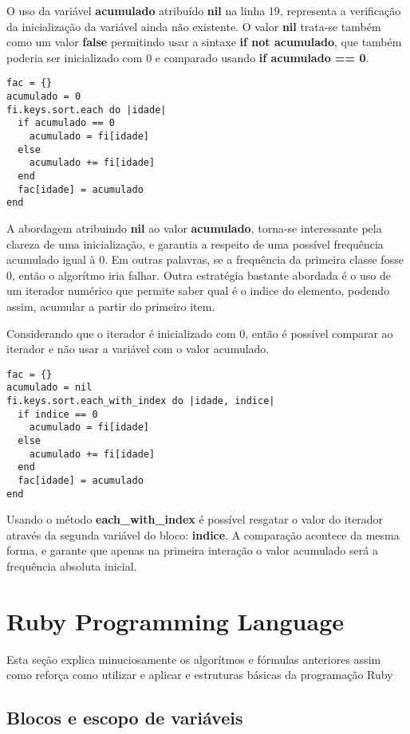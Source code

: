 \documentclass[12pt]{article}
\newcommand{\code}[1] {\textbf{#1}}
\begin{document}
O uso da variável \code{acumulado} atribuído \code{nil} na linha 19, representa a verificação da inicialização da variável ainda não existente. O valor \code{nil} trata-se também como um valor \code{false} permitindo usar a sintaxe \code{if not acumulado}, que também poderia ser inicializado com 0 e comparado usando \code{if acumulado == 0}.

\begin{lstlisting}[caption=Usando acumulado com valor inicial 0]
fac = {}
acumulado = 0 
fi.keys.sort.each do |idade|
  if acumulado == 0
    acumulado = fi[idade]
  else
    acumulado += fi[idade]
  end
  fac[idade] = acumulado
end
\end{lstlisting}

A abordagem atribuindo \code{nil} ao valor \code{acumulado}, torna-se interessante pela clareza de uma inicialização, e garantia a respeito de uma possível frequência acumulado igual à 0. Em outras palavras, se a frequência da primeira classe fosse 0, então o algorítmo iria falhar. Outra estratégia bastante abordada é o uso de um iterador numérico que permite saber qual é o indice do elemento, podendo assim, acumular a partir do primeiro item.

Considerando que o iterador é inicializado com 0, então é possível comparar ao iterador e não usar a variável com o valor acumulado.


\begin{lstlisting}[caption=Usando acumulado através do iterador \code{indice}, label=usa indice]
fac = {}
acumulado = nil
fi.keys.sort.each_with_index do |idade, indice|
  if indice == 0
    acumulado = fi[idade]
  else
    acumulado += fi[idade]
  end
  fac[idade] = acumulado
end
\end{lstlisting}

Usando o método \code{each\_with\_index} é possível resgatar o valor do iterador através da segunda variável do bloco: \code{indice}. A comparação acontece da mesma forma, e garante que apenas na primeira interação o valor acumulado será a frequência absoluta inicial.

\section{Ruby Programming Language}

Esta seção explica minuciosamente os algorítmos e fórmulas anteriores assim como reforça como utilizar e aplicar e estruturas básicas da programação Ruby

\subsection{Blocos e escopo de variáveis}
\end{document}
